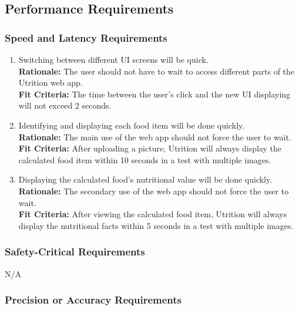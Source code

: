 \documentclass[12pt]{article}
\begin{document}
{\subsection{Performance Requirements}

\subsubsection{Speed and Latency Requirements}

\begin{enumerate}[start=1,label={PR\arabic*.}]
	\item Switching between different UI screens will be quick.\\
	\textbf{Rationale:} The user should not have to wait to access different parts of the Utrition web app.\\
	\textbf{Fit Criteria:} The time between the user’s click and the new UI displaying will not exceed 2 seconds.
	\item Identifying and displaying each food item will be done quickly.\\
	\textbf{Rationale:} The main use of the web app should not force the user to wait.\\
	\textbf{Fit Criteria:} After uploading a picture, Utrition will always display the calculated food item within 10 seconds in a test with multiple images.
	\item Displaying the calculated food’s nutritional value will be done quickly. \\
	\textbf{Rationale:} The secondary use of the web app should not force the user to wait. \\
	\textbf{Fit Criteria:} After viewing the calculated food item, Utrition will always display the nutritional facts within 5 seconds in a test with multiple images.
\end{enumerate}

\subsubsection{Safety-Critical Requirements}
\hspace{1.5cm}N/A

\subsubsection{Precision or Accuracy Requirements}

}
\end{document}
